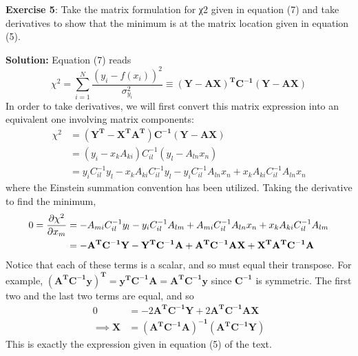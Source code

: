 \documentclass[11pt]{article}
\begin{document}
\noindent

{\bf Exercise 5}: Take the matrix formulation for χ2 given in equation (7) and take derivatives to show that the minimum is at the matrix location given in equation (5).

{\bf Solution:} Equation (7) reads
\begin{equation}
    \chi^2 = \sum_{i=1}^{N} \frac{(y_i - f(x_i))^2}{\sigma_{y_i}^2} \equiv \mathbf{(Y - A X)^T C^{-1} (Y - A X)}
\end{equation}
In order to take derivatives, we will first convert this matrix expression into an equivalent one involving matrix components:
\begin{equation}
    \begin{aligned}
        \chi^2  &= \mathbf{(Y^T - X^T A^T) C^{-1} (Y - A X)} \\
                &= (y_i - x_k A_{ki}) C_{il}^{-1} (y_l - A_{ln} x_n) \\
                &= y_i C_{il}^{-1} y_l - x_k A_{ki} C_{il}^{-1} y_l - y_i C_{il}^{-1} A_{ln} x_n + x_k A_{ki} C_{il}^{-1} A_{ln} x_n
    \end{aligned}
\end{equation}
where the Einstein summation convention has been utilized. Taking the derivative to find the minimum,
\begin{equation}
    \begin{aligned}
        0 = \pdv{\chi^2}{x_m}   &= - A_{mi} C_{il}^{-1} y_l - y_i C_{il}^{-1} A_{lm} + A_{mi} C_{il}^{-1} A_{ln} x_n + x_k A_{ki} C_{il}^{-1} A_{lm} \\
                            &= - \mathbf{A^T C^{-1} Y - Y^{T} C^{-1} A + A^T C^{-1} A X + X^T A^T C^{-1} A}
    \end{aligned}
\end{equation}
Notice that each of these terms is a scalar, and so must equal their transpose. For example, $\mathbf{(A^T C^{-1} y)^T} = \mathbf{y^T C^{-1} A} = \mathbf{A^T C^{-1} y}$ since $\mathbf{C^{-1}}$ is symmetric. The first two and the last two terms are equal, and so
\begin{equation}
    \begin{aligned}
        0 &= - 2 \mathbf{A^T C^{-1} Y} + 2 \mathbf{A^T C^{-1} A X} \\
        \implies \mathbf{X} &= \mathbf{(A^T C^{-1} A)^{-1} (A^T C^{-1} Y)}
    \end{aligned}
\end{equation}
This is exactly the expression given in equation (5) of the text.
\end{document}

